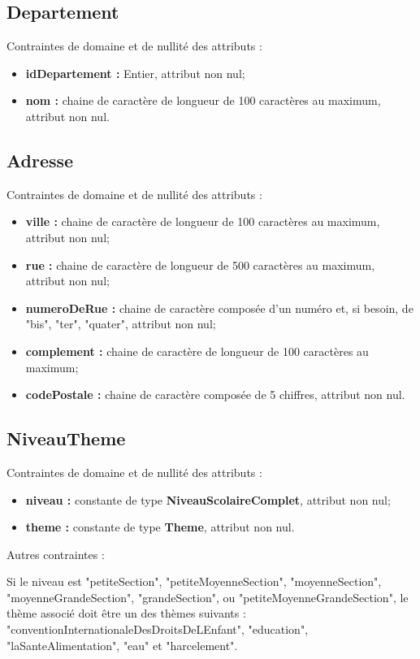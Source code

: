 \documentclass[asi, sansVersion]{picInsa}
\begin{document}
\subsection*{Departement}
Contraintes de domaine et de nullité des attributs :
\begin{itemize}
	\item \textbf{idDepartement :} Entier, attribut non nul;
	\item \textbf{nom :} chaine de caractère de longueur de 100 caractères au maximum, attribut non nul.\\
\end{itemize}

\subsection*{Adresse}
Contraintes de domaine et de nullité des attributs :
\begin{itemize}
 	\item \textbf{ville :} chaine de caractère de longueur de 100 caractères au maximum, attribut non nul;
	\item \textbf{rue :} chaine de caractère de longueur de 500 caractères au maximum, attribut non nul;
	\item \textbf{numeroDeRue :} chaine de caractère composée d'un numéro et, si besoin, de "bis", "ter", "quater", attribut non nul; 
	\item \textbf{complement : } chaine de caractère de longueur de 100 caractères au maximum;
	\item \textbf{codePostale :} chaine de caractère composée de 5 chiffres, attribut non nul.\\
\end{itemize}

\subsection*{NiveauTheme}
Contraintes de domaine et de nullité des attributs :
\begin{itemize}
	\item \textbf{niveau :} constante de type \textbf{NiveauScolaireComplet}, attribut non nul;
	\item \textbf{theme :} constante de type \textbf{Theme}, attribut non nul.\\
\end{itemize}

Autres contraintes :

Si le niveau est "petiteSection", "petiteMoyenneSection", "moyenneSection", "moyenneGrandeSection", "grandeSection", ou "petiteMoyenneGrandeSection", le thème associé doit être un des thèmes suivants : "conventionInternationaleDesDroitsDeLEnfant", "education", "laSanteAlimentation", "eau" et "harcelement". 
\end{document}
